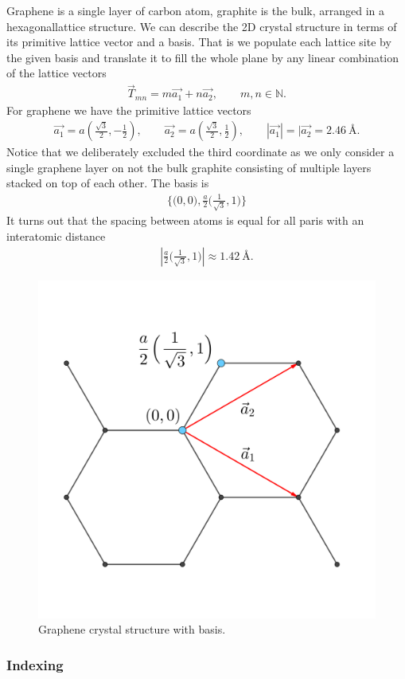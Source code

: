 Graphene is a single layer of carbon atom, graphite is the bulk, arranged in a hexagonallattice structure. We can describe the 2D crystal
structure in terms of its primitive lattice vector and a basis. That is we populate each lattice site by the given basis and translate it to
fill the whole plane by any linear combination of the lattice vectors
\begin{align*}
  \vec{T}_{mn} = m\vec{a_1} + n\vec{a_2}, \qquad m,n \in \mathbb{N}.
\end{align*}
For graphene we have the primitive lattice vectors 
\begin{align*}
  \vec{a_1} = a \left(\frac{\sqrt{3}}{2}, -\frac{1}{2}\right), \qquad \vec{a_2} = a \left(\frac{\sqrt{3}}{2}, \frac{1}{2}\right), \qquad |\vec{a_1}| = |\vec{a_2} = 2.46 \ \text{Å}.
\end{align*}
Notice that we deliberately excluded the third coordinate as we only consider a single graphene layer on not the bulk graphite consisting of
multiple layers stacked on top of each other. The basis is 
\begin{align*}
  \Big\{\Big(0,0\Big), \frac{a}{2}\Big(\frac{1}{\sqrt{3}}, 1 \Big) \Big\}
\end{align*}
It turns out that the spacing between atoms is equal for all paris with an interatomic distance 
\begin{align*}
  \left|\frac{a}{2}\Big(\frac{1}{\sqrt{3}}, 1 \Big)\right| \approx 1.42 \ \text{Å}.
\end{align*}


\begin{figure}[H]
  \centering
  \includegraphics[width=0.3\linewidth]{figures/crystal.png}
  \caption{Graphene crystal structure with basis.}
  \label{fig:graphene_crystal}
\end{figure}



\subsubsection{Indexing}

